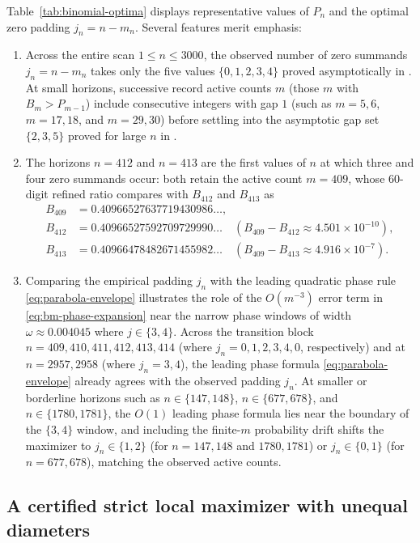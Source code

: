 \documentclass[11pt]{article}
\numberwithin{equation}{section}
\theoremstyle{definition}
\theoremstyle{remark}
\begin{document}
Table~\ref{tab:binomial-optima} displays representative values of $P_n$ and
the optimal zero padding $j_n=n-m_n$. Several features merit emphasis:
\begin{enumerate}[label=(\arabic*),leftmargin=2em]
\item Across the entire scan $1\le n\le3000$, the observed number of zero
summands $j_n=n-m_n$ takes only the five values $\{0,1,2,3,4\}$ proved
asymptotically in \citet[Theorem~4.1]{BellBernoulli2026}. At small horizons,
successive record active counts $m$ (those $m$ with $B_m>P_{m-1}$) include
consecutive integers with gap $1$ (such as $m=5,6$, $m=17,18$, and $m=29,30$)
before settling into the asymptotic gap set $\{2,3,5\}$ proved for large $n$
in \citet[Theorem~4.1]{BellBernoulli2026}.
\item The horizons $n=412$ and $n=413$ are the first values of $n$ at which
three and four zero summands occur: both retain the active count $m=409$,
whose 60-digit refined ratio compares with $B_{412}$ and $B_{413}$ as
\begin{align*}
 B_{409}&=0.40966527637719430986\ldots,\\
 B_{412}&=0.40966527592709729990\ldots\quad(B_{409}-B_{412}\approx 4.501\times10^{-10}),\\
 B_{413}&=0.40966478482671455982\ldots\quad(B_{409}-B_{413}\approx 4.916\times10^{-7}).
\end{align*}
\item Comparing the empirical padding $j_n$ with the leading quadratic phase
rule \eqref{eq:parabola-envelope} illustrates the role of the $O(m^{-3})$
error term in \eqref{eq:bm-phase-expansion} near the narrow phase windows of
width $\omega\approx0.004045$ where $j\in\{3,4\}$. Across the transition
block $n=409,410,411,412,413,414$ (where $j_n=0,1,2,3,4,0$, respectively) and
at $n=2957,2958$ (where $j_n=3,4$), the leading phase formula
\eqref{eq:parabola-envelope} already agrees with the observed padding $j_n$.
At smaller or borderline horizons such as $n\in\{147,148\}$, $n\in\{677,678\}$,
and $n\in\{1780,1781\}$, the $O(1)$ leading phase formula lies near the
boundary of the $\{3,4\}$ window, and including the finite-$m$ probability
drift shifts the maximizer to $j_n\in\{1,2\}$ (for $n=147,148$ and
$1780,1781$) or $j_n\in\{0,1\}$ (for $n=677,678$), matching the observed
active counts.
\end{enumerate}

\subsection{A certified strict local maximizer with unequal diameters}\label{subsec:local-trap}
\end{document}
